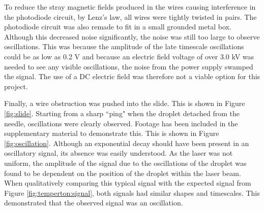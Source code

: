 \documentclass{physics_article_B}
\begin{document}
        \vspace*{-0.3cm}To reduce the stray magnetic fields produced in the wires causing interference in the photodiode circuit, by Lenz's law, all wires were tightly twisted in pairs. The photodiode circuit was also remade to fit in a small grounded metal box. Although this decreased noise significantly, the noise was still too large to observe oscillations. This was because the amplitude of the late timescale oscillations could be as low as 0.2 V and because an electric field voltage of over 3.0 kV was needed to see any visible oscillations, the noise from the power supply swamped the signal. The use of a DC electric field was therefore not a viable option for this project. 
        
        Finally, a wire obstruction was pushed into the slide. This is shown in Figure \ref{fig:slide}. Starting from a sharp ``ping" when the droplet detached from the needle, oscillations were clearly observed. Footage has been included in the supplementary material to demonstrate this. This is shown in Figure \ref{fig:oscillation}. Although an exponential decay should have been present in an oscillatory signal, its absence was easily understood. As the laser was not uniform, the amplitude of the signal due to the oscillations of the droplet was found to be dependent on the position of the droplet within the laser beam. When qualitatively comparing this typical signal with the expected signal from Figure \ref{fig:temperton:signal}, both signals had similar shapes and timescales. This demonstrated that the observed signal was an oscillation. 
        
\end{document}
